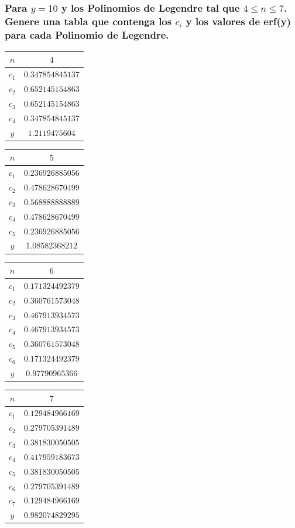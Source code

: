 \documentclass[12pt,letterpaper]{article}
\begin{document}
\subsubsection{Para $y=10$ y los Polinomios de Legendre tal que $4 \leq n \leq 7$. Genere una tabla que contenga los $c_i$ y los valores de erf(y) para cada Polinomio de Legendre.}

\begin{table}[!h]
\begin{tabular}{|c|c|}
\hline
$n$ & $4$ \\ \hline 
$c_1$ & $0.347854845137$ \\ \hline 
$c_2$ & $0.652145154863$ \\ \hline 
$c_3$ & $0.652145154863$ \\ \hline 
$c_4$ & $0.347854845137$ \\ \hline 
$y$ & $1.2119475604$ \\ \hline 
\end{tabular}
\begin{tabular}{|c|c|}
\hline
$n$ & $5$ \\ \hline 
$c_1$ & $0.236926885056$ \\ \hline 
$c_2$ & $0.478628670499$ \\ \hline 
$c_3$ & $0.568888888889$ \\ \hline 
$c_4$ & $0.478628670499$ \\ \hline 
$c_5$ & $0.236926885056$ \\ \hline 
$y$ & $1.08582368212$ \\ \hline 
\end{tabular}
\begin{tabular}{|c|c|}
\hline
$n$ & $6$ \\ \hline 
$c_1$ & $0.171324492379$ \\ \hline 
$c_2$ & $0.360761573048$ \\ \hline 
$c_3$ & $0.467913934573$ \\ \hline 
$c_4$ & $0.467913934573$ \\ \hline 
$c_5$ & $0.360761573048$ \\ \hline 
$c_6$ & $0.171324492379$ \\ \hline 
$y$ & $0.97790965366$ \\ \hline 
	\end{tabular}
\begin{tabular}{|c|c|}
\hline
$n$ & $7$ \\ \hline 
$c_1$ & $0.129484966169$ \\ \hline 
$c_2$ & $0.279705391489$ \\ \hline 
$c_3$ & $0.381830050505$ \\ \hline 
$c_4$ & $0.417959183673$ \\ \hline 
$c_5$ & $0.381830050505$ \\ \hline 
$c_6$ & $0.279705391489$ \\ \hline 
$c_7$ & $0.129484966169$ \\ \hline 
$y$ & $0.982074829295$ \\ \hline
	\end{tabular}
\end{table}
\end{document}
